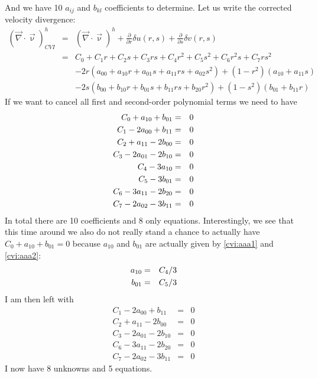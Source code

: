 And we have 10 $a_{ij}$ and $b_{kl}$ coefficients to determine.
Let us write the corrected velocity divergence:
\begin{eqnarray}
(\vec\nabla\cdot\vec\upnu)^h_{CVI} 
&=&
(\vec\nabla\cdot\vec\upnu)^h 
+
\frac{\partial}{\partial r} \delta u(r,s)
+
\frac{\partial}{\partial s} \delta v(r,s) \nonumber\\
&=& C_0 + C_1 r + C_2 s + C_3 rs + C_4 r^2 + C_5 s^2 + C_6 r^2s + C_7 rs^2 \nonumber\\
&& -2r (a_{00}+ a_{10}r + a_{01}s + a_{11}rs + a_{02}s^2 ) + (1-r^2) (a_{10} + a_{11}s ) \nonumber\\
&&-2s(b_{00}+ b_{10}r + b_{01}s + b_{11}rs + b_{20}r^2  ) + (1-s^2)(b_{01} + b_{11}r  )\nonumber
\end{eqnarray}
If we want to cancel all first and second-order polynomial terms we need to have
\begin{eqnarray}
C_0 + a_{10} + b_{01} &=& 0 \nonumber\\
C_1 -2a_{00}  +b_{11} &=& 0 \nonumber\\ 
C_2 + a_{11} -2b_{00} &=& 0 \nonumber\\ 
C_3 -2a_{01} -2b_{10} &=& 0 \nonumber\\ 
C_4 -3a_{10}          &=& 0 \label{cvi:aaa1}\\ 
C_5 -3b_{01}          &=& 0 \label{cvi:aaa2}\\ 
C_6 -3a_{11} -2b_{20} &=& 0 \nonumber\\ 
C_7 -2a_{02} -3b_{11} &=& 0 \nonumber 
\end{eqnarray}
In total there are 10 coefficients and 8 only equations. Interestingly, 
we see that this time around we also do not really stand a chance to 
actually have $C_0 +a_{10}+b_{01}=0$ 
because $a_{10}$ and $b_{01}$ are actually given by \eqref{cvi:aaa1} and \eqref{cvi:aaa2}:
\begin{eqnarray}
a_{10} &=& C_4/3 \nonumber\\
b_{01} &=& C_5/3 \nonumber
\end{eqnarray}
I am then left with
\begin{eqnarray}
C_1 -2a_{00}  +b_{11} &=& 0 \label{cvi:aaa5} \\ 
C_2 + a_{11} -2b_{00} &=& 0 \label{cvi:aaa6} \\ 
C_3 -2a_{01} -2b_{10} &=& 0 \label{cvi:aaa7} \\ 
C_6 -3a_{11} -2b_{20} &=& 0 \label{cvi:aaa3} \\ 
C_7 -2a_{02} -3b_{11} &=& 0 \label{cvi:aaa4} 
\end{eqnarray}
I now have 8 unknowns and 5 equations.
